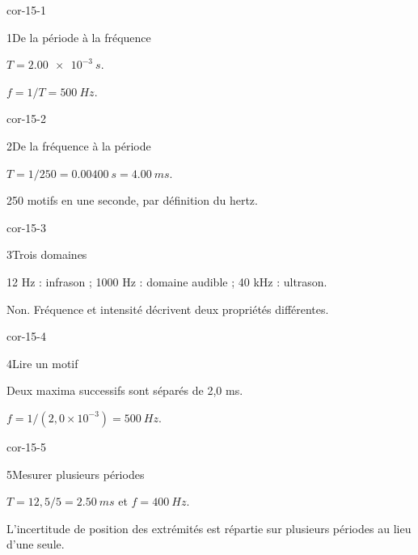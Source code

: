 \clearpage{}
\corrigesSouples
\begin{blocLivre}{cor-15-1}\begin{corrige}{1}{De la période à la fréquence}
\begin{questions}
\item $T=\qty{2,00e-3}{s}$.
\item $f=1/T=\qty{500}{Hz}$.
\end{questions}
\end{corrige}\end{blocLivre}
\begin{blocLivre}{cor-15-2}\begin{corrige}{2}{De la fréquence à la période}
\begin{questions}
\item $T=1/250=\qty{0,00400}{s}=\qty{4,00}{ms}$.
\item 250 motifs en une seconde, par définition du hertz.
\end{questions}
\end{corrige}\end{blocLivre}
\begin{blocLivre}{cor-15-3}\begin{corrige}{3}{Trois domaines}
\begin{questions}
\item 12 Hz : infrason ; 1000 Hz : domaine audible ; 40 kHz : ultrason.
\item Non. Fréquence et intensité décrivent deux propriétés différentes.
\end{questions}
\end{corrige}\end{blocLivre}
\begin{blocLivre}{cor-15-4}\begin{corrige}{4}{Lire un motif}
\begin{questions}
\item Deux maxima successifs sont séparés de 2,0 ms.
\item $f=1/(2,0\times10^{-3})=\qty{500}{Hz}$.
\end{questions}
\end{corrige}\end{blocLivre}
\begin{blocLivre}{cor-15-5}\begin{corrige}{5}{Mesurer plusieurs périodes}
\begin{questions}
\item $T=12,5/5=\qty{2,50}{ms}$ et $f=\qty{400}{Hz}$.
\item L’incertitude de position des extrémités est répartie sur plusieurs périodes au lieu d’une seule.
\end{questions}
\end{corrige}\end{blocLivre}
